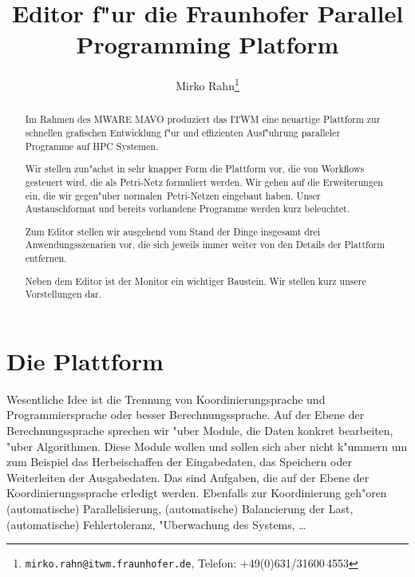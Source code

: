 \documentclass[a4paper,12pt]{article}
\newlength{\st}\setlength{\st}{0pt}
\begin{document}
\title{Editor f"ur die Fraunhofer Parallel Programming Platform}

\author{Mirko Rahn\thanks{\texttt{mirko.rahn@itwm.fraunhofer.de},
    Telefon: +49(0)631/31600\,4553}}

\maketitle

\begin{abstract}
  Im Rahmen des MWARE MAVO produziert das ITWM eine neuartige
  Plattform zur schnellen grafischen Entwicklung f"ur und effizienten
  Ausf"uhrung paralleler Programme auf HPC Systemen.

  Wir stellen zun"achst in sehr knapper Form die Plattform vor, die
  von Workflows gesteuert wird, die als Petri-Netz formuliert
  werden. Wir gehen auf die Erweiterungen ein, die wir gegen"uber
  \glqq normalen\grqq\ Petri-Netzen eingebaut haben. Unser
  Austauschformat und bereits vorhandene Programme werden kurz
  beleuchtet.
  
  Zum Editor stellen wir ausgehend vom Stand der Dinge insgesamt drei
  Anwendungsszenarien vor, die sich jeweils immer weiter von den
  Details der Plattform entfernen.

  Neben dem Editor ist der Monitor ein wichtiger Baustein. Wir stellen
  kurz unsere Vorstellungen dar.
\end{abstract}

\clearpage
\tableofcontents
\clearpage

\section{Die Plattform}

Wesentliche Idee ist die Trennung von Koordinierungsprache und
Programmiersprache oder besser Berechnungssprache. Auf der Ebene der
Berechnungssprache sprechen wir "uber Module, die Daten konkret
bearbeiten, "uber Algorithmen. Diese Module wollen und sollen sich
aber nicht k"ummern um zum Beispiel das Herbeischaffen der
Eingabedaten, das Speichern oder Weiterleiten der Ausgabedaten. Das
sind Aufgaben, die auf der Ebene der Koordinierungssprache erledigt
werden. Ebenfalls zur Koordinierung geh"oren (automatische)
Parallelisierung, (automatische) Balancierung der Last, (automatische)
Fehlertoleranz, "Uberwachung des Systems, \ldots \cite{gelernter}
\end{document}
